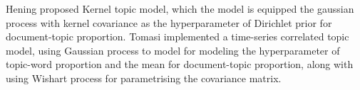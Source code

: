 Hening\cite{hennig_kernel_2012} proposed Kernel topic model, which the model is equipped the gaussian process with kernel covariance as the hyperparameter of Dirichlet prior for document-topic proportion.
Tomasi\cite{tomasi_stochastic_nodate} implemented a time-series correlated topic model, using Gaussian process to model for modeling the hyperparameter of topic-word proportion and the mean for document-topic proportion, along with using Wishart process for parametrising the covariance matrix.
